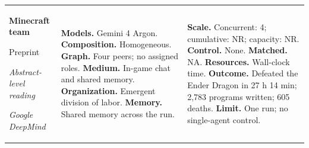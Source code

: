 \begin{longtable}{@{}>{\raggedright\arraybackslash}p{}>{\raggedright\arraybackslash}p{}>{\raggedright\arraybackslash}p{}@{}}
\textbf{Minecraft team}\par \citep{gemini4-argon-minecraft}\par Preprint\par\emph{Abstract-level reading}\par\emph{Google DeepMind} & \textbf{Models.} Gemini 4 Argon. \textbf{Composition.} Homogeneous. \textbf{Graph.} Four peers; no assigned roles. \textbf{Medium.} In-game chat and shared memory. \textbf{Organization.} Emergent division of labor. \textbf{Memory.} Shared memory across the run. & \textbf{Scale.} Concurrent: 4; cumulative: NR; capacity: NR. \textbf{Control.} None. \textbf{Matched.} NA. \textbf{Resources.} Wall-clock time. \textbf{Outcome.} Defeated the Ender Dragon in 27 h 14 min; 2,783 programs written; 605 deaths. \textbf{Limit.} One run; no single-agent control. \\
\end{longtable}
\endgroup

